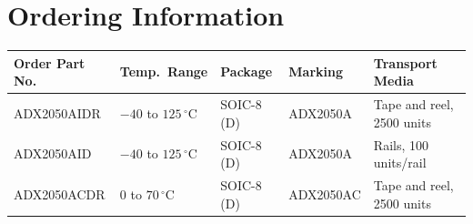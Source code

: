 \section{Ordering Information}
\begin{center}
\begin{tabular}{@{}L{3.2cm}C{2.2cm}C{2.0cm}C{2.2cm}L{3.6cm}@{}}
\toprule
{}
{\footnotesize\bfseries Order Part No.} & {\footnotesize\bfseries Temp.\ Range} & {\footnotesize\bfseries Package} & {\footnotesize\bfseries Marking} & {\footnotesize\bfseries Transport Media} \\
\midrule
ADX2050AIDR  & $-40$ to $125\,^{\circ}$C & SOIC-8 (D) & ADX2050A  & Tape and reel, 2500 units \\
ADX2050AID   & $-40$ to $125\,^{\circ}$C & SOIC-8 (D) & ADX2050A  & Rails, 100 units/rail \\
ADX2050ACDR  & $0$ to $70\,^{\circ}$C    & SOIC-8 (D) & ADX2050AC & Tape and reel, 2500 units \\
\bottomrule
\end{tabular}
\end{center}

